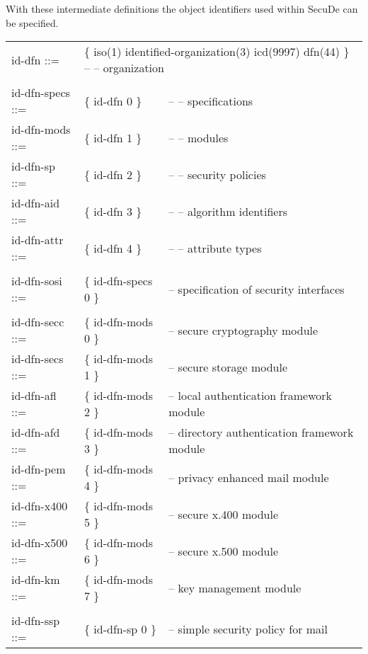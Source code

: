 With these intermediate definitions
the object identifiers used within SecuDe
can be specified.

{\small
\begin {center}
\begin {tabular}{lll}
id-dfn ::= &
\multicolumn{2}{l}{\{ iso(1) identified-organization(3) icd(9997) dfn(44) \}
-- -- organization} \\
 & & \\
id-dfn-specs ::= & \{ id-dfn 0 \} & -- -- specifications \\
id-dfn-mods ::=  & \{ id-dfn 1 \} & -- -- modules \\
id-dfn-sp ::= & \{ id-dfn 2 \} & -- -- security policies \\
id-dfn-aid ::= & \{ id-dfn 3 \} & -- -- algorithm identifiers \\
id-dfn-attr ::= & \{ id-dfn 4 \} & -- -- attribute types \\
 & & \\
id-dfn-sosi ::= & \{ id-dfn-specs 0 \} & -- specification of security interfaces \\
 & & \\
id-dfn-secc ::= & \{ id-dfn-mods 0 \} & -- secure cryptography module \\
id-dfn-secs ::= & \{ id-dfn-mods 1 \} & -- secure storage module \\
id-dfn-afl ::= & \{ id-dfn-mods 2 \} & -- local authentication framework module \\
id-dfn-afd ::= & \{ id-dfn-mods 3 \} & -- directory authentication framework module \\
id-dfn-pem ::= & \{ id-dfn-mods 4 \} & -- privacy enhanced mail module \\
id-dfn-x400 ::= & \{ id-dfn-mods 5 \} & -- secure x.400 module \\
id-dfn-x500 ::= & \{ id-dfn-mods 6 \} & -- secure x.500 module \\
id-dfn-km ::= & \{ id-dfn-mods 7 \} & -- key management module \\
 & & \\
id-dfn-ssp ::= & \{ id-dfn-sp 0 \} & -- simple security policy for mail \\
\end {tabular}
\end {center}
}

